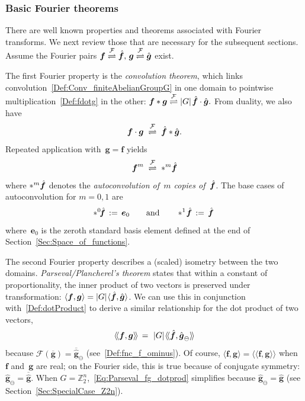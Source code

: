 \documentclass[letterpaper,11pt]{article}
\newcommand{\bs}[1]{{\boldsymbol{#1}}}
\newcommand{\gr}[1]{( #1 )}
\newcommand{\abs}[1]{\vert #1 \vert}
\newcommand{\Int}{\mathbb Z}
\newcommand{\conv}{\ast}
\newcommand{\ip}[2]{\langle #1, #2 \rangle}
\newcommand{\dotprod}[2]{\langle\!\langle #1, #2 \rangle\!\rangle}
\newcommand{\hatbsf}{{\kern+0.25em}\hat{{\kern-0.25em}\bs{f}}}
\theoremstyle{definition} \newtheorem{remark}{Remark}
\begin{document}
\subsubsection{Basic Fourier theorems}
There are well known properties and theorems associated with Fourier transforms. We next review those that are necessary for the subsequent sections. Assume the Fourier pairs $\bs{f} \stackrel{\mathcal{F}}\rightleftharpoons \hatbsf,\, \bs{g} \stackrel{\mathcal{F}}\rightleftharpoons \hat{\bs{g}}$ exist.

The first Fourier property is the \emph{convolution theorem}, which links convolution~\eqref{Def:Conv_finiteAbelianGroupG} in one domain to pointwise multiplication~\eqref{Def:fdotg} in the other:
$\bs{f} \conv \bs{g} \stackrel{\mathcal{F}}\rightleftharpoons \abs{G}\;\! \hatbsf \cdot \hat{\bs{g}}.$ From duality, we also have
\begin{equation} \label{Def:ConvThm_fdotg_fconvg}
\bs{f} \cdot \bs{g} \;\stackrel{\mathcal{F}}\rightleftharpoons\; \hatbsf \conv \hat{\bs{g}}.
\end{equation}
Repeated application with~$\bs{g} = \bs{f}$ yields
\begin{equation} \label{Eq:f^m=*^mfhat}
\bs{f}^m \;\stackrel{\mathcal{F}}\rightleftharpoons\;
\conv^m \hatbsf
\end{equation}
where $\conv^m \hatbsf$ denotes the \emph{autoconvolution of~$m$ copies of~$\hatbsf$}. The base cases of autoconvolution for $m=0,1$ are
\begin{equation} \label{Def:conv^0,1}
\conv^0 \!\hatbsf \,:=\, \bs{e}_0
\qquad\text{and}\qquad
\conv^1 \!\hatbsf \,:=\, \hat{\bs{f\,}}
\end{equation}
where~$\bs{e}_0$ is the zeroth standard basis element defined at the end of Section~\ref{Sec:Space_of_functions}.

The second Fourier property describes a (scaled) isometry between the two domains. \emph{Parseval/Plancherel's theorem} states that within a constant of proportionality, the inner product of two vectors is preserved under transformation: $\ip{\bs{f}}{\bs{g}} = \abs{G} \:\!\ip{\hatbsf}{\hat{\bs{g}}}$. We can use this in conjunction with~\eqref{Def:dotProduct} to derive a similar relationship for the dot product of two vectors,
\begin{equation} \label{Eq:Parseval_fg_dotprod}
\dotprod{\bs{f}}{\bs{g}} \,=\ \abs{G} \:\!\dotprod{\hatbsf}{\hat{\bs{g}}_\ominus}
\end{equation}
because $\mathcal{F}\gr{\overline{\bs{g}}} = \overline{\hat{\bs{g}}}_\ominus$ (see~\eqref{Def:fnc_f_ominus}). Of course, $\ip{\bs{f}}{\bs{g}} = \dotprod{\bs{f}}{\bs{g}}$
when~$\bs{f}$ and~$\bs{g}$ are real; on the Fourier side, this is true because of conjugate symmetry: $\hat{\bs{g}}_\ominus = \overline{\hat{\bs{g}}}$. When $G=\Int_2^n$,~\eqref{Eq:Parseval_fg_dotprod} simplifies because $\hat{\bs{g}}_\ominus = \hat{\bs{g}}$ (see Section~\ref{Sec:SpecialCase_Z2n}).
\end{document}

